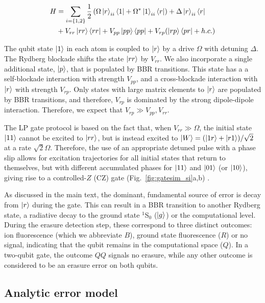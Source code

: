 \documentclass[%
reprint,
superscriptaddress,
 amsmath,amssymb,
 aps,
 prx,
floatfix,
]{revtex4-1}
\begin{document}
\begin{equation}
\begin{split}
    H &= \sum_{i=\{1,2\}} \frac{1}{2} \left(\Omega \ket{r}_{ii} \bra{1} + \Omega^* \ket{1}_{ii} {\bra{r}}\right) + \Delta \ket{r}_{ii}\bra{r} \\
    &+ V_{rr} \ket{rr}\bra{rr} + V_{pp} \ket{pp}\bra{pp} + V_{rp} (\ket{rp}\bra{pr} + h.c.)
\end{split}
\label{eq:ham}
\end{equation}

The qubit state $\ket{1}$ in each atom is coupled to $\ket{r}$ by a drive $\Omega$ with detuning $\Delta$. The Rydberg blockade shifts the state $\ket{rr}$ by $V_{rr}$. We also incorporate a single additional state, $\ket{p}$, that is populated by BBR transitions. This state has a a self-blockade interaction with strength $V_{pp}$, and a cross-blockade interaction with $\ket{r}$ with strength $V_{rp}$. Only states with large matrix elements to $\ket{r}$ are populated by BBR transitions, and therefore, $V_{rp}$ is dominated by the strong dipole-dipole interaction. Therefore, we expect that $V_{rp} \gg V_{pp},V_{rr}$.

The LP gate protocol is based on the fact that, when $V_{rr} \gg \Omega$, the initial state $\ket{11}$ cannot be excited to $\ket{rr}$, but is instead excited to $\ket{W} = (\ket{1r} + \ket{r1})/\sqrt{2}$ at a rate $\sqrt{2}\Omega$. Therefore, the use of an appropriate detuned pulse with a phase slip allows for excitation trajectories for all initial states that return to themselves, but with different accumulated phases for $\ket{11}$ and $\ket{01}$ (or $\ket{10}$), giving rise to a controlled-$Z$ (CZ) gate (Fig.~\ref{fig:gatesim_si}a,b) \cite{Levine2019}.

As discussed in the main text, the dominant, fundamental source of error is decay from $\ket{r}$ during the gate. This can result in a BBR transition to another Rydberg state, a radiative decay to the ground state $^1$S$_0$ ($\ket{g}$) or the computational level. During the erasure detection step, these correspond to three distinct outcomes: ion fluorescence (which we abbreviate $B$), ground state fluorescence ($R$) or no signal, indicating that the qubit remains in the computational space ($Q$). In a two-qubit gate, the outcome $QQ$ signals no erasure, while any other outcome is considered to be an erasure error on both qubits.

\subsection{Analytic error model}
\label{app:analyticerrors}
\end{document}
